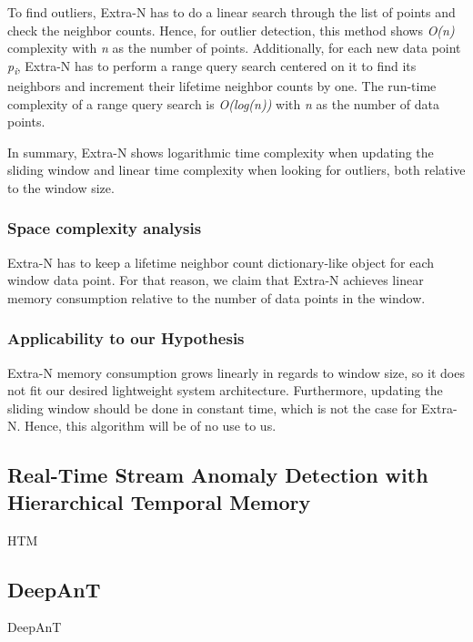 To find outliers, Extra-N has to do a linear search through the list of points and check the neighbor counts. Hence, for outlier detection, this method shows \textit{O(n)} complexity with \textit{n} as the number of points. Additionally, for each new data point \textit{p\textsubscript{i}}, Extra-N has to perform a range query search centered on it to find its neighbors and increment their lifetime neighbor counts by one. The run-time complexity of a range query search is \textit{O(log(n))} \cite{range-query-log} with \textit{n} as the number of data points.

In summary, Extra-N shows logarithmic time complexity when updating the sliding window and linear time complexity when looking for outliers, both relative to the window size.


\subsubsection*{Space complexity analysis}
Extra-N has to keep a lifetime neighbor count dictionary-like object for each window data point. For that reason, we claim that Extra-N achieves linear memory consumption relative to the number of data points in the window.

\subsubsection*{Applicability to our Hypothesis}
Extra-N memory consumption grows linearly in regards to window size, so it does not fit our desired lightweight system architecture. Furthermore, updating the sliding window should be done in constant time, which is not the case for Extra-N. Hence, this algorithm will be of no use to us.

\subsection{Real-Time Stream Anomaly Detection with Hierarchical Temporal Memory}
HTM

\subsection{DeepAnT}
DeepAnT

